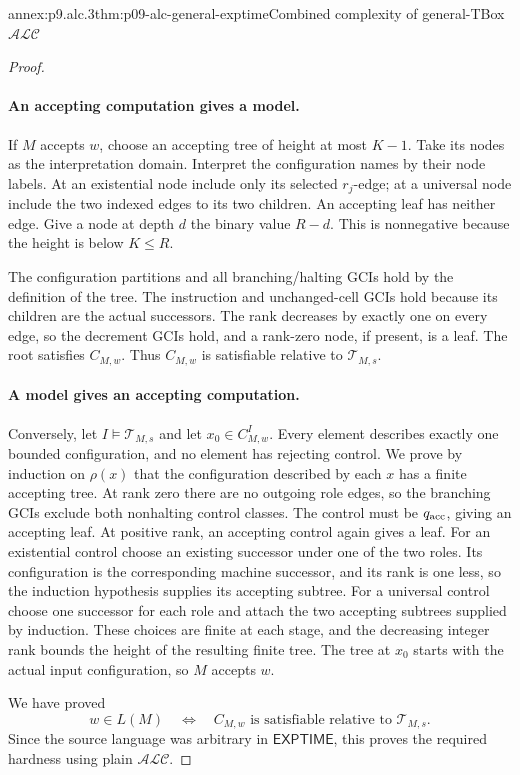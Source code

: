 \begin{annexitem}{annex:p9.alc.3}{thm:p09-alc-general-exptime}{Combined complexity of general-TBox \(\mathcal{ALC}\)}
\begin{proof}
\paragraph{An accepting computation gives a model.}
If \(M\) accepts \(w\), choose an accepting tree of height at most
\(K-1\).  Take its nodes as the interpretation domain.
Interpret the configuration names by their node labels.
At an existential node include only its selected \(r_j\)-edge;
at a universal node include the two indexed edges to its two children.
An accepting leaf has neither edge.
Give a node at depth \(d\) the binary value \(R-d\).
This is nonnegative because the height is below \(K\leq R\).

The configuration partitions and all branching/halting GCIs hold
by the definition of the tree.
The instruction and unchanged-cell GCIs hold because its children
are the actual successors.
The rank decreases by exactly one on every edge, so the decrement
GCIs hold, and a rank-zero node, if present, is a leaf.
The root satisfies \(C_{M,w}\).
Thus \(C_{M,w}\) is satisfiable relative to \(\mathcal T_{M,s}\).

\paragraph{A model gives an accepting computation.}
Conversely, let \(I\models\mathcal T_{M,s}\) and let
\(x_0\in C_{M,w}^I\).
Every element describes exactly one bounded configuration, and no
element has rejecting control.
We prove by induction on \(\rho(x)\) that the configuration described
by each \(x\) has a finite accepting tree.
At rank zero there are no outgoing role edges, so the branching
GCIs exclude both nonhalting control classes.  The control must
be \(q_{\rm acc}\), giving an accepting leaf.
At positive rank, an accepting control again gives a leaf.
For an existential control choose an existing successor under one
of the two roles.  Its configuration is the corresponding machine
successor, and its rank is one less, so the induction hypothesis
supplies its accepting subtree.
For a universal control choose one successor for each role and
attach the two accepting subtrees supplied by induction.
These choices are finite at each stage, and the decreasing integer
rank bounds the height of the resulting finite tree.
The tree at \(x_0\) starts with the actual input configuration,
so \(M\) accepts \(w\).

We have proved
\[
 w\in L(M)\quad\Longleftrightarrow\quad
 C_{M,w}\text{ is satisfiable relative to }\mathcal T_{M,s}.
\]
Since the source language was arbitrary in \(\mathsf{EXPTIME}\),
this proves the required hardness using plain \(\mathcal{ALC}\).


\end{proof}
\end{annexitem}
